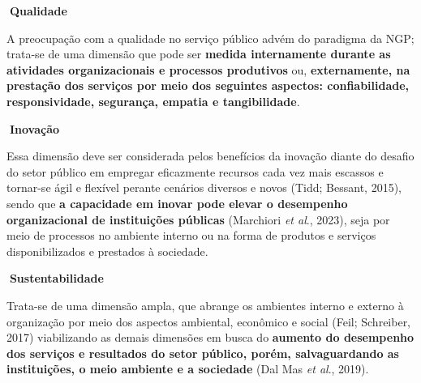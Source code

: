 \documentclass[
  letterpaper,
  DIV=11,
  numbers=noendperiod]{scrreprt}
\begin{document}
\begin{tcolorbox}[enhanced jigsaw, bottomrule=.15mm, arc=.35mm, breakable, toprule=.15mm, rightrule=.15mm, opacityback=0, left=2mm, colback=white, leftrule=.75mm]

\textbf{🔽{Qualidade}}\vspace{2mm}

A preocupação com a qualidade no serviço público advém do paradigma da
NGP; trata-se de uma dimensão que pode ser \textbf{medida internamente
durante as atividades organizacionais e processos produtivos} ou,
\textbf{externamente, na prestação dos serviços por meio dos seguintes
aspectos: confiabilidade, responsividade, segurança, empatia e
tangibilidade}.

\end{tcolorbox}

\begin{tcolorbox}[enhanced jigsaw, bottomrule=.15mm, arc=.35mm, breakable, toprule=.15mm, rightrule=.15mm, opacityback=0, left=2mm, colback=white, leftrule=.75mm]

\textbf{🔽{Inovação}}\vspace{2mm}

Essa dimensão deve ser considerada pelos benefícios da inovação diante
do desafio do setor público em empregar eficazmente recursos cada vez
mais escassos e tornar-se ágil e flexível perante cenários diversos e
novos (Tidd; Bessant, 2015), sendo que \textbf{a capacidade em inovar
pode elevar o desempenho organizacional de instituições públicas}
(Marchiori \emph{et al}., 2023), seja por meio de processos no ambiente
interno ou na forma de produtos e serviços disponibilizados e prestados
à sociedade.

\end{tcolorbox}

\begin{tcolorbox}[enhanced jigsaw, bottomrule=.15mm, arc=.35mm, breakable, toprule=.15mm, rightrule=.15mm, opacityback=0, left=2mm, colback=white, leftrule=.75mm]

\textbf{🔽{Sustentabilidade}}\vspace{2mm}

Trata-se de uma dimensão ampla, que abrange os ambientes interno e
externo à organização por meio dos aspectos ambiental, econômico e
social (Feil; Schreiber, 2017) viabilizando as demais dimensões em busca
do \textbf{aumento do desempenho dos serviços e resultados do setor
público, porém, salvaguardando as instituições, o meio ambiente e a
sociedade} (Dal Mas \emph{et al}., 2019).

\end{tcolorbox}
\end{document}
